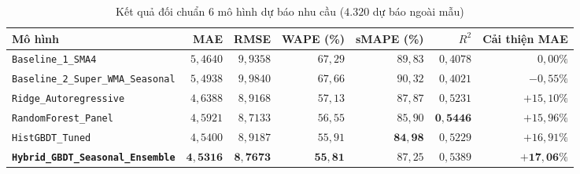 \begin{table}[H]
	\centering
	\caption{Kết quả đối chuẩn $6$ mô hình dự báo nhu cầu ($4.320$ dự báo ngoài mẫu)}
	\label{tab:ml-forecast-benchmark}
	\scriptsize
	\setlength{\tabcolsep}{3.5pt}
	\begin{tabular}{p{4.6cm} r r r r r r}
		\toprule
		\textbf{Mô hình}                                                & \textbf{MAE}        & \textbf{RMSE}       & \textbf{WAPE (\%)} & \textbf{sMAPE (\%)} & \textbf{$R^2$}      & \textbf{Cải thiện MAE} \\
		\midrule
		\texttt{Baseline_1_SMA4}                              & $5{,}4640$          & $9{,}9358$          & $67{,}29$          & $89{,}83$           & $0{,}4078$          & $0{,}00\%$             \\
		\texttt{Baseline_2_Super_WMA_Seasonal}                & $5{,}4938$          & $9{,}9840$          & $67{,}66$          & $90{,}32$           & $0{,}4021$          & $-0{,}55\%$            \\
		\texttt{Ridge_Autoregressive}                   & $4{,}6388$          & $8{,}9168$          & $57{,}13$          & $87{,}87$           & $0{,}5231$          & $+15{,}10\%$           \\
		\texttt{RandomForest_Panel}                         & $4{,}5921$          & $8{,}7133$          & $56{,}55$          & $85{,}90$           & $\mathbf{0{,}5446}$ & $+15{,}96\%$           \\
		\texttt{HistGBDT_Tuned}                               & $4{,}5400$          & $8{,}9187$          & $55{,}91$          & $\mathbf{84{,}98}$  & $0{,}5229$          & $+16{,}91\%$           \\
		\textbf{\texttt{Hybrid\_GBDT\_Seasonal\_\allowbreak{}Ensemble}} & $\mathbf{4{,}5316}$ & $\mathbf{8{,}7673}$ & $\mathbf{55{,}81}$ & $87{,}25$           & $0{,}5389$          & $\mathbf{+17{,}06\%}$  \\
		\bottomrule
	\end{tabular}
\end{table}

